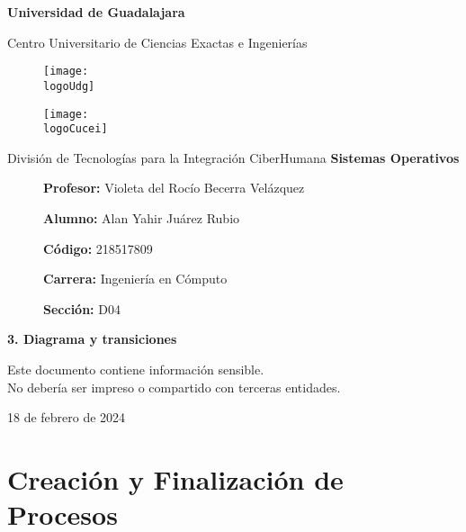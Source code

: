 \documentclass[12pt, a4paper]{article} %
\title{\theTitle}
\author{\theAuthor}
\newcommand{\logoUdg}{../../../../attachments/images/portada-udg.jpeg}
\newcommand{\logoCucei}{../../../../attachments/images/portada-cucei.jpeg}
\newcommand{\materia}{Sistemas Operativos}
\newcommand{\theTitle}{3. Diagrama y transiciones}
\newcommand{\profesor}{Violeta del Rocío Becerra Velázquez}
\newcommand{\theAuthor}{Alan Yahir Juárez Rubio}
\newcommand{\code}{218517809}
\newcommand{\carrera}{Ingeniería en Cómputo}
\newcommand{\seccion}{D04}
\newcommand{\startDate}{18 de febrero de 2024}
\newcommand{\nl}{\par\vspace{0.4cm}}
\begin{document}
\cfoot{\ifodd\value{page}\else\thepage\fi} %

\begin{titlepage}
	\centering
	{\huge\textbf{Universidad de Guadalajara}}\par\vspace{0.6cm}
	{\LARGE{Centro Universitario de Ciencias Exactas e Ingenierías}}\vfill
	
	\begin{figure}[h]
		\begin{minipage}[t]{0.45\textwidth}
			\centering
			\texttt{[image: \\logoUdg]}
		\end{minipage}
		\hfill
		\begin{minipage}[t]{0.45\textwidth}
			\centering
			\texttt{[image: \\logoCucei]}
		\end{minipage}
	\end{figure}\vfill
	
	{\Large{División de Tecnologías para la Integración CiberHumana}}\vfill
	{\Large\textbf{\materia}}\vfill
	\begin{figure}[h]
		\centering
		\begin{minipage}[t]{0.75\textwidth}
			{\Large
				\textbf{Profesor:} \profesor\nl
				\textbf{Alumno:} \theAuthor\nl
				\textbf{Código:} \code\nl
				\textbf{Carrera:} \carrera\nl
				\textbf{Sección:} \seccion
			}
		\end{minipage}
	\end{figure}\vfill
	{\LARGE{\textbf{\theTitle}}}\vfill
	
	\begin{tcolorbox}[colback=red!5!white, colframe=red!75!black]
		\centering
		Este documento contiene información sensible.\\
		No debería ser impreso o compartido con terceras entidades.
	\end{tcolorbox}\vfill
	{\large \startDate}\par
\end{titlepage}

\clearpage
\tableofcontents

\clearpage
\listoffigures
	
\listoftables

\clearpage

\section{Creación y Finalización de Procesos}
\end{document}
